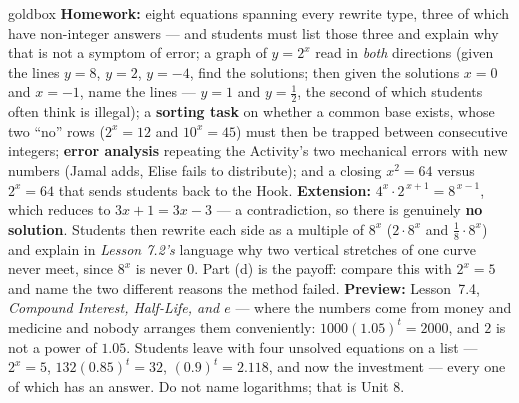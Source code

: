 \documentclass[10pt]{article}
\begin{document}
\begin{skillbox}{goldbox}
\textbf{Homework:} eight equations spanning every rewrite type, three of which have non-integer answers
--- and students must list those three and explain why that is not a symptom of error; a graph of
$y=2^{x}$ read in \emph{both} directions (given the lines $y=8$, $y=2$, $y=-4$, find the solutions;
then given the solutions $x=0$ and $x=-1$, name the lines --- $y=1$ and $y=\frac12$, the second of
which students often think is illegal); a \textbf{sorting task} on whether a common base exists, whose
two ``no'' rows ($2^{x}=12$ and $10^{x}=45$) must then be trapped between consecutive integers;
\textbf{error analysis} repeating the Activity's two mechanical errors with new numbers (Jamal adds,
Elise fails to distribute); and a closing $x^{2}=64$ versus $2^{x}=64$ that sends students back to the
Hook. \textbf{Extension:} $4^{x}\cdot2^{\,x+1}=8^{\,x-1}$, which reduces to $3x+1=3x-3$ --- a
contradiction, so there is genuinely \textbf{no solution}. Students then rewrite each side as a
multiple of $8^{x}$ ($2\cdot8^{x}$ and $\frac18\cdot8^{x}$) and explain in \emph{Lesson 7.2's} language
why two vertical stretches of one curve never meet, since $8^{x}$ is never $0$. Part (d) is the payoff:
compare this with $2^{x}=5$ and name the two different reasons the method failed. \textbf{Preview:}
Lesson~7.4, \emph{Compound Interest, Half-Life, and $e$} --- where the numbers come from money and
medicine and nobody arranges them conveniently: $1000(1.05)^{t}=2000$, and $2$ is not a power of
$1.05$. Students leave with four unsolved equations on a list --- $2^{x}=5$, $132(0.85)^{t}=32$,
$(0.9)^{t}=2.118$, and now the investment --- every one of which has an answer. Do not name logarithms;
that is Unit 8.
\end{skillbox}
\end{document}
